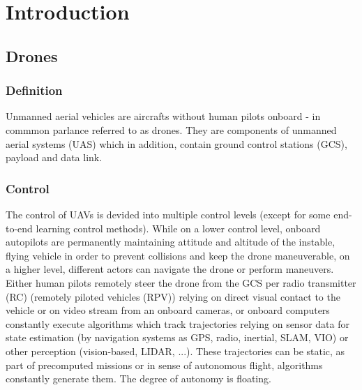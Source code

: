 
\chapter{Introduction} %

\label{Chapter1} %


\section{Drones}

\subsection{Definition}
Unmanned aerial vehicles are 
aircrafts without human pilots onboard
- in commmon parlance referred to as drones.
They are components of unmanned aerial systems (UAS)
which in addition, contain ground control stations (GCS),
payload and data link. \cite{Fahlstrom2012}

\subsection{Control}
The control of UAVs is devided into multiple control levels
(except for some end-to-end learning control methods).
While on a lower control level, 
onboard autopilots are permanently maintaining attitude and altitude of the
instable, flying vehicle in order to prevent collisions and keep the drone maneuverable,
on a higher level, different actors can navigate the drone or perform maneuvers.
Either human pilots remotely steer the drone from
the GCS per radio transmitter (RC) (remotely piloted vehicles (RPV)) 
relying on direct visual contact to the vehicle 
or on video stream from an onboard cameras,
or onboard computers constantly execute 
algorithms which track trajectories relying on sensor data for state estimation 
(by navigation systems as GPS, radio, inertial, SLAM, VIO) or other
perception (vision-based, LIDAR, ...). These trajectories can be static,
as part of
precomputed missions or in sense of autonomous flight,
algorithms constantly generate them.
The degree of autonomy is floating.

